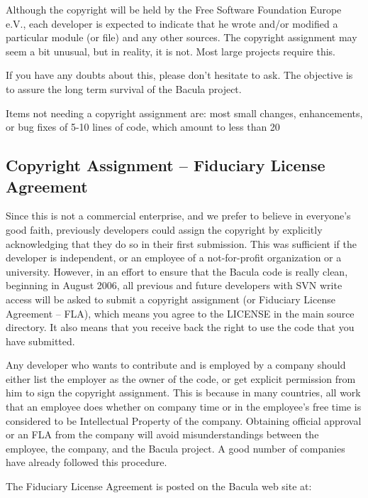 Although the copyright will be held by the Free Software
Foundation Europe e.V., each developer is expected to indicate
that he wrote and/or modified a particular module (or file) and
any other sources.  The copyright assignment may seem a bit
unusual, but in reality, it is not.  Most large projects require
this.

If you have any doubts about this, please don't hesitate to ask.  The
objective is to assure the long term survival of the Bacula project. 

Items not needing a copyright assignment are: most small changes,
enhancements, or bug fixes of 5-10 lines of code, which amount to    
less than 20%

\subsection{Copyright Assignment -- Fiduciary License Agreement}

Since this is not a commercial enterprise, and we prefer to believe in
everyone's good faith, previously developers could assign the copyright by
explicitly acknowledging that they do so in their first submission.  This
was sufficient if the developer is independent, or an employee of a
not-for-profit organization or a university.  However, in an effort to
ensure that the Bacula code is really clean, beginning in August 2006, all
previous and future developers with SVN write access will be asked to submit a
copyright assignment (or Fiduciary License Agreement -- FLA),
which means you agree to the LICENSE in the main source
directory. It also means that you receive back the right to use
the code that you have submitted.

Any developer who wants to contribute and is employed by a company should
either list the employer as the owner of the code, or get explicit
permission from him to sign the copyright assignment.  This is because in
many countries, all work that an employee does whether on company time or
in the employee's free time is considered to be Intellectual Property of
the company.  Obtaining official approval or an FLA from the company will
avoid misunderstandings between the employee, the company, and the Bacula
project.  A good number of companies have already followed this procedure.

The Fiduciary License Agreement is posted on the Bacula web site at:

